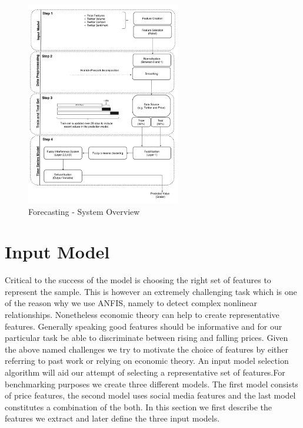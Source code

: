 \begin{figure}[H]
        \centering
         \includegraphics[width=0.6\textwidth ]{img/model/architecture}
              
        \caption{Forecasting - System Overview}
        \label{fig:system_architecture}
\end{figure}



\section{Input Model}

Critical to the success of the model is choosing the right set of features to represent the sample. This is however an extremely challenging task which is one of the reason why we use ANFIS, namely to detect complex nonlinear relationships. Nonetheless   economic theory can help to create representative features. Generally speaking good features should be informative and for our particular task be able to discriminate between rising and falling prices. Given the above named challenges we try to  motivate the choice of features by either referring to past work or relying on economic theory. An input model selection algorithm will aid our attempt of selecting a representative set of features.For benchmarking purposes we create three different models. The first model consists of price features, the second model uses social media features and the last model constitutes a combination of the both. In this section we first describe the features we extract and later define the three input models. 

